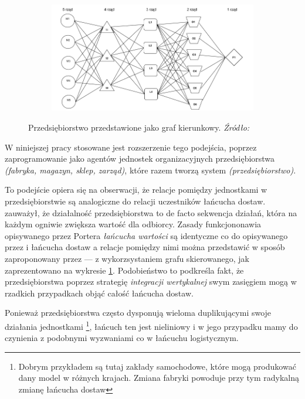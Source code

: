 \documentclass[polish, twoside, 12pt, a4paper]{article}
\theoremstyle{definition}
\theoremstyle{plain}
\theoremstyle{remark}
\begin{document}
\begin{figure}[hbt]
  \centering
  \begin{subfigure}[t]{0.45\textwidth}
    \includegraphics[width=\textwidth]{pictures/siec.png}
  \end{subfigure}
  \captionsetup{margin=10pt,font=small,labelfont=bf,width=.8\textwidth}
  \caption[Przedsiębiorstwo jako graf kierunkowy]{Przedsiębiorstwo przedstawione jako graf kierunkowy. \textit{Źródło:} \cite{Kawa2010}}\label{fig:siecKawa}
\end{figure}


W niniejszej pracy stosowane jest rozszerzenie tego podejścia, poprzez zaprogramowanie jako agentów jednostek organizacyjnych przedsiębiorstwa \textit{(fabryka, magazyn, sklep, zarząd)}, które razem tworzą system \textit{(przedsiębiorstwo)}. 

To podejście opiera się na obserwacji, że relacje pomiędzy jednostkami w przedsiębiorstwie są analogiczne do relacji uczestników łańcucha dostaw. \cite{Porter1985} zauważył, że działalność przedsiębiorstwa to de facto sekwencja działań, która na każdym ogniwie zwiększa wartość dla odbiorcy. Zasady funkcjononawia opisywanego przez Portera \textit{łańcucha wartości} są identyczne co do opisywanego przez \cite{Moyaux2006} i \cite{Kawa2010} łańcucha dostaw a relacje pomiędzy nimi można przedstawić w sposób zaproponowany przez \cite{Kawa2010} --- z wykorzsystaniem grafu skierowanego, jak zaprezentowano na wykresie \ref{fig:siecKawa}. Podobieństwo to podkreśla fakt, że przedsiębiorstwa poprzez strategię \textit{integracji wertykalnej} swym zasięgiem mogą w rzadkich przypadkach objąć całość łańcucha dostaw.  

Ponieważ przedsiębiorstwa często dysponują wieloma duplikującymi swoje działania jednostkami \footnote{Dobrym przykładem są tutaj zakłady samochodowe, które mogą produkować dany model w różnych krajach. Zmiana fabryki powoduje przy tym radykalną zmianę łańcucha dostaw}, łańcuch ten jest nieliniowy i w jego przypadku mamy do czynienia z podobnymi wyzwaniami co w łańcuchu logistycznym.
\end{document}

